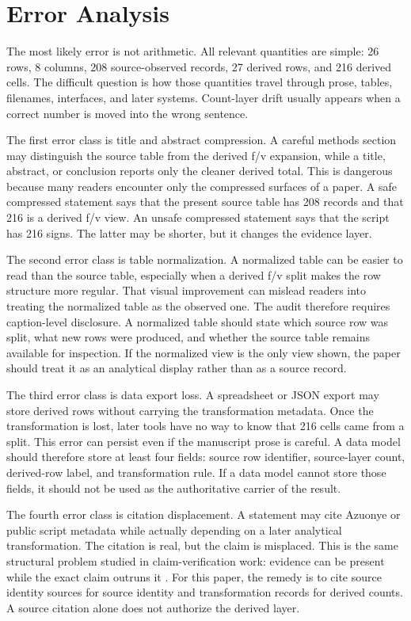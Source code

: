 \documentclass[sigconf,nonacm]{acmart}
\begin{document}
\section{Error Analysis}
The most likely error is not arithmetic. All relevant quantities are simple:
26 rows, 8 columns, 208 source-observed records, 27 derived rows, and 216 derived
cells. The difficult question is how those quantities travel through prose,
tables, filenames, interfaces, and later systems. Count-layer drift usually
appears when a correct number is moved into the wrong sentence.

The first error class is title and abstract compression. A careful methods
section may distinguish the source table from the derived f/v expansion, while
a title, abstract, or conclusion reports only the cleaner derived total. This is
dangerous because many readers encounter only the compressed surfaces of a
paper. A safe compressed statement says that the present source table has
208 records and that 216 is a derived f/v view. An unsafe compressed statement
says that the script has 216 signs. The latter may be shorter, but it changes
the evidence layer.

The second error class is table normalization. A normalized table can be easier
to read than the source table, especially when a derived f/v split makes the row
structure more regular. That visual improvement can mislead readers into
treating the normalized table as the observed one. The audit therefore requires
caption-level disclosure. A normalized table should state which source row was
split, what new rows were produced, and whether the source table remains
available for inspection. If the normalized view is the only view shown, the
paper should treat it as an analytical display rather than as a source record.

The third error class is data export loss. A spreadsheet or JSON export may
store derived rows without carrying the transformation metadata. Once the
transformation is lost, later tools have no way to know that 216 cells came from
a split. This error can persist even if the manuscript prose is careful. A data
model should therefore store at least four fields: source row identifier,
source-layer count, derived-row label, and transformation rule. If a data model
cannot store those fields, it should not be used as the authoritative carrier of
the result.

The fourth error class is citation displacement. A statement may cite Azuonye or
public script metadata while actually depending on a later analytical
transformation. The citation is real, but the claim is misplaced. This is the
same structural problem studied in claim-verification work: evidence can be
present while the exact claim outruns it \cite{wadden2020scifact,gao2023alce}.
For this paper, the remedy is to cite source identity sources for source
identity and transformation records for derived counts. A source citation alone
does not authorize the derived layer.
\end{document}
